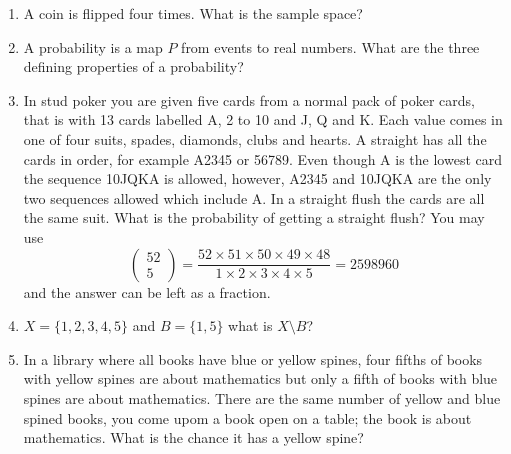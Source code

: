 \documentclass{article}
\newif\ifanswer
\begin{document}
\begin{enumerate}

\item A coin is flipped four times. What is the sample space?

  \ifanswer
  Solution: 
  $\{TTTT,TTTH,TTHT,TTHH,THTT,THTH,THHT,THHH,HTTT,HTTH,HTHT,HTHH,HHTT,HHTH,HHHT,HHHH\}$.
  \fi


\item A probability is a map $P$ from events to real numbers. What are the three defining properties of a probability?

  \ifanswer
    Solution: 
\begin{enumerate}
\item $P(A)\ge 0$ for all events.
\item $P(X)=1$
\item If $A\cap B=\emptyset$ for two events $A$ and $B$ then 
\begin{equation}
P(A\cup B)=P(A)+P(B)
\end{equation}
\end{enumerate}
where $A\cap B$ and $A\cup B$ are the intersection and union of $A$
and $B$ and $\emptyset$ is the empty set.
\fi
  
\item In stud poker you are given five cards from a normal pack of
  poker cards, that is with 13 cards labelled A, 2 to 10 and J, Q and
  K. Each value comes in one of four suits, spades, diamonds, clubs
  and hearts.  A straight has all the cards in order, for example
  A2345 or 56789. Even though A is the lowest card the sequence 10JQKA
  is allowed, however, A2345 and 10JQKA are the only two sequences
  allowed which include A. In a straight flush the cards are all the
  same suit. What is the probability of getting a straight flush? You may use
 $$
\left(\begin{array}{c}52\\5\end{array}\right)=\frac{52\times 51\times 50\times 49\times 48}{1\times 2 \times 3 \times 4\times 5}=2598960
  $$
  and the answer can be left as a fraction.

  \ifanswer
    Solution: 
  $$P=40/2598960=1/64974$$
  \fi

\item $X=\{1,2,3,4,5\}$ and $B=\{1,5\}$ what is $X\setminus B$?

  \ifanswer
    Solution: 
  $$x\setminus B = \{2,3,4\}$$
  \fi

\item In a library where all books have blue or yellow spines, four
  fifths of books with yellow spines are about mathematics but only
  a fifth of books with blue spines are about mathematics. There
  are the same number of yellow and blue spined books, you come upom a book open on a table; the book is about mathematics. What is the chance it has a yellow spine?


\end{enumerate}
\end{document}
